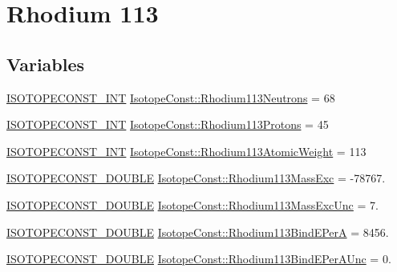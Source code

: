 \hypertarget{group___isotope_const-_rhodium-_rh113}{}\section{Rhodium 113}
\label{group___isotope_const-_rhodium-_rh113}
\subsection*{Variables}
\begin{DoxyCompactItemize}
\item 
\mbox{\hyperlink{group___isotope_const-_macros_ga5f18360b3e99483a35c32d789e62621c}{I\+S\+O\+T\+O\+P\+E\+C\+O\+N\+S\+T\+\_\+\+I\+NT}} \mbox{\hyperlink{group___isotope_const-_rhodium-_rh113_ga1ba61987ae6e769582b290d6a96e09bc}{Isotope\+Const\+::\+Rhodium113\+Neutrons}} = 68
\item 
\mbox{\hyperlink{group___isotope_const-_macros_ga5f18360b3e99483a35c32d789e62621c}{I\+S\+O\+T\+O\+P\+E\+C\+O\+N\+S\+T\+\_\+\+I\+NT}} \mbox{\hyperlink{group___isotope_const-_rhodium-_rh113_gad84a690c19fe0e2e0794fe6e07d57b5b}{Isotope\+Const\+::\+Rhodium113\+Protons}} = 45
\item 
\mbox{\hyperlink{group___isotope_const-_macros_ga5f18360b3e99483a35c32d789e62621c}{I\+S\+O\+T\+O\+P\+E\+C\+O\+N\+S\+T\+\_\+\+I\+NT}} \mbox{\hyperlink{group___isotope_const-_rhodium-_rh113_ga11f8712825e40ed286ef8079dd0b409a}{Isotope\+Const\+::\+Rhodium113\+Atomic\+Weight}} = 113
\item 
\mbox{\hyperlink{group___isotope_const-_macros_ga8f45a7272ce02c0b4c65c44636ed719a}{I\+S\+O\+T\+O\+P\+E\+C\+O\+N\+S\+T\+\_\+\+D\+O\+U\+B\+LE}} \mbox{\hyperlink{group___isotope_const-_rhodium-_rh113_ga2ba7581302835d311082ee32f2409c3a}{Isotope\+Const\+::\+Rhodium113\+Mass\+Exc}} = -\/78767.
\item 
\mbox{\hyperlink{group___isotope_const-_macros_ga8f45a7272ce02c0b4c65c44636ed719a}{I\+S\+O\+T\+O\+P\+E\+C\+O\+N\+S\+T\+\_\+\+D\+O\+U\+B\+LE}} \mbox{\hyperlink{group___isotope_const-_rhodium-_rh113_ga54198fc42790f24c21be9aba557f8866}{Isotope\+Const\+::\+Rhodium113\+Mass\+Exc\+Unc}} = 7.
\item 
\mbox{\hyperlink{group___isotope_const-_macros_ga8f45a7272ce02c0b4c65c44636ed719a}{I\+S\+O\+T\+O\+P\+E\+C\+O\+N\+S\+T\+\_\+\+D\+O\+U\+B\+LE}} \mbox{\hyperlink{group___isotope_const-_rhodium-_rh113_ga547ee90ce572072a2baa2307b43c9465}{Isotope\+Const\+::\+Rhodium113\+Bind\+E\+PerA}} = 8456.
\item 
\mbox{\hyperlink{group___isotope_const-_macros_ga8f45a7272ce02c0b4c65c44636ed719a}{I\+S\+O\+T\+O\+P\+E\+C\+O\+N\+S\+T\+\_\+\+D\+O\+U\+B\+LE}} \mbox{\hyperlink{group___isotope_const-_rhodium-_rh113_ga19a0910145a1312a9b6537f99f2ec3d9}{Isotope\+Const\+::\+Rhodium113\+Bind\+E\+Per\+A\+Unc}} = 0.

\end{DoxyCompactItemize}
